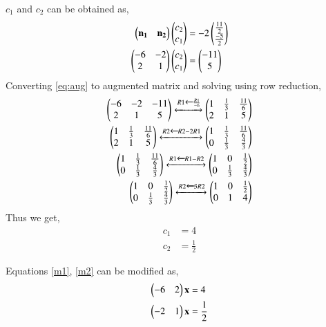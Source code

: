 \documentclass[journal,12pt,twocolumn]{IEEEtran}
\begin{document}
$c_1$ and $c_2$ can be obtained as, 
\begin{align}
    \begin{pmatrix}\mathbf{n_1} & \mathbf{n_2}\end{pmatrix}\begin{pmatrix}c_2\\c_1\end{pmatrix} & =-2\begin{pmatrix}\frac{11}{2}\\\frac{-5}{2}\end{pmatrix} \\
    \begin{pmatrix}-6 & -2 \\2 & 1\end{pmatrix}\begin{pmatrix}c_2\\c_1\end{pmatrix} &= \begin{pmatrix}-11 \\ 5\end{pmatrix} \label{eq:aug}
\end{align}
Converting \eqref{eq:aug} to augmented matrix and solving using row reduction, 
\begin{align}
    \begin{pmatrix}-6 & -2 & -11 \\ 2 & 1 & 5\end{pmatrix} \xleftrightarrow[]{R1 \xleftarrow{} \frac{R1}{-6}} \begin{pmatrix}1 & \frac{1}{3} & \frac{11}{6} \\ 2 & 1 & 5\end{pmatrix} \\
    \begin{pmatrix}1 & \frac{1}{3} & \frac{11}{6} \\ 2 & 1 & 5\end{pmatrix}\xleftrightarrow[]{R2 \xleftarrow{} R2-2R1 } \begin{pmatrix}1 & \frac{1}{3} & \frac{11}{6} \\ 0 & \frac{1}{3} & \frac{4}{3}\end{pmatrix} \\ 
    \begin{pmatrix}1 & \frac{1}{3} & \frac{11}{6} \\ 0 & \frac{1}{3} & \frac{4}{3}\end{pmatrix}
    \xleftrightarrow[]{R1 \xleftarrow{} R1-R2} \begin{pmatrix}1 & 0 & \frac{1}{2} \\ 0 & \frac{1}{3} & \frac{4}{3}\end{pmatrix} \\
    \begin{pmatrix}1 & 0 & \frac{1}{2} \\ 0 & \frac{1}{3} & \frac{4}{3}\end{pmatrix}
    \xleftrightarrow[]{R2 \xleftarrow{} 3R2} \begin{pmatrix}1 & 0 & \frac{1}{2} \\ 0 & 1 & 4\end{pmatrix}
\end{align}
Thus we get, 
\begin{align}
    c_1 &= 4\\
    c_2 &= \frac{1}{2}
\end{align}

Equations \eqref{m1}, \eqref{m2} can be modified as, 
\begin{align}
    \begin{pmatrix}-6 & 2\end{pmatrix}\mathbf{x} &= 4\\
    \begin{pmatrix}-2 & 1\end{pmatrix}\mathbf{x} &= \frac{1}{2}
\end{align}
\end{document}
